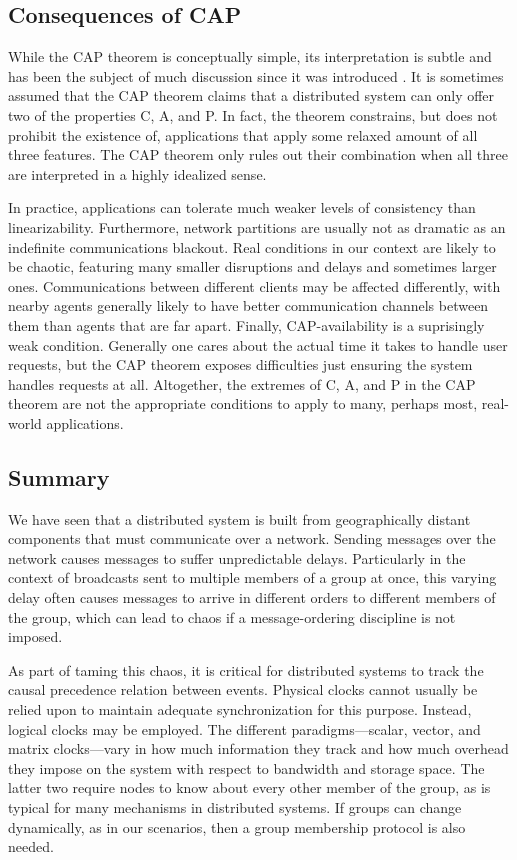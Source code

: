 \documentclass[]             %
{NASA}                       %
\theoremstyle{definition}
\begin{document}
\subsection{Consequences of CAP}
\label{interpretation-of-the-cap-theorem}
While the CAP theorem is conceptually simple, its interpretation is
subtle and has been the subject of much discussion since it was
introduced \cite{2012CAP12Years}. It is sometimes assumed that the CAP
theorem claims that a distributed system can only offer two of the
properties C, A, and P.  In fact, the theorem constrains, but does not
prohibit the existence of, applications that apply some relaxed amount
of all three features. The CAP theorem only rules out their
combination when all three are interpreted in a highly idealized
sense.

In practice, applications can tolerate much weaker levels of
consistency than linearizability. Furthermore, network partitions are
usually not as dramatic as an indefinite communications blackout. Real
conditions in our context are likely to be chaotic, featuring many
smaller disruptions and delays and sometimes larger
ones. Communications between different clients may be affected
differently, with nearby agents generally likely to have better
communication channels between them than agents that are far
apart. Finally, CAP-availability is a suprisingly weak condition.
Generally one cares about the actual time it takes to handle user
requests, but the CAP theorem exposes difficulties just ensuring the
system handles requests at all. Altogether, the extremes of C, A, and
P in the CAP theorem are not the appropriate conditions to apply to
many, perhaps most, real-world applications.

\subsection{Summary}
\label{sec:background-summary}

We have seen that a distributed system is built from geographically
distant components that must communicate over a network. Sending
messages over the network causes messages to suffer unpredictable
delays. Particularly in the context of broadcasts sent to multiple
members of a group at once, this varying delay often causes messages
to arrive in different orders to different members of the group, which
can lead to chaos if a message-ordering discipline is not imposed.

As part of taming this chaos, it is critical for distributed systems
to track the causal precedence relation between events. Physical
clocks cannot usually be relied upon to maintain adequate
synchronization for this purpose. Instead, logical clocks may be
employed. The different paradigms---scalar, vector, and matrix
clocks---vary in how much information they track and how much overhead
they impose on the system with respect to bandwidth and storage
space. The latter two require nodes to know about every other member
of the group, as is typical for many mechanisms in distributed
systems. If groups can change dynamically, as in our scenarios, then a
group membership protocol is also needed.
\end{document}
